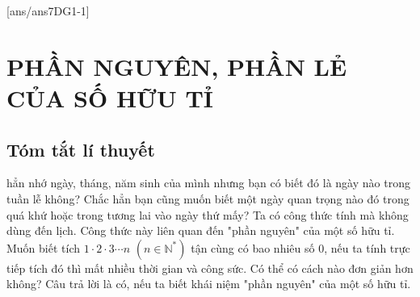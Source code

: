 [ans/ans7DG1-1]
\section{PHẦN NGUYÊN, PHẦN LẺ CỦA SỐ HỮU TỈ}
\subsection{Tóm tắt lí thuyết}
  hẳn nhớ ngày, tháng, năm sinh của mình nhưng bạn có biết đó là ngày nào trong tuần lễ không? Chắc hẳn bạn cũng muốn biết một ngày quan trọng nào đó trong quá khứ hoặc trong tương lai vào ngày thứ mấy? Ta có công thức tính mà không dùng đến lịch. Công thức này liên quan đến "phần nguyên" của một số hữu tỉ. Muốn biết tích $1\cdot 2\cdot 3\cdots n$ $(n\in \mathbb{N}^*)$ tận cùng có bao nhiêu số $0$, nếu ta tính trực tiếp tích đó thì mất nhiều thời gian và công sức. Có thể có cách nào đơn giản hơn không? Câu trả lời là có, nếu ta biết khái niệm "phần nguyên" của một số hữu tỉ.
